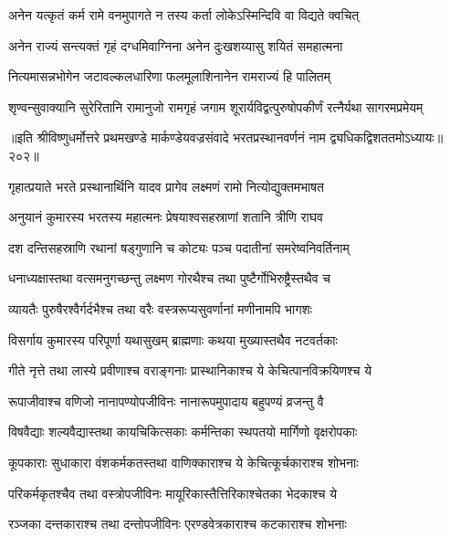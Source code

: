 \twolineshloka
{अनेन यत्कृतं कर्म रामे वनमुपागते}
{न तस्य कर्ता लोकेऽस्मिन्दिवि वा विद्यते क्वचित्}%

\twolineshloka
{अनेन राज्यं सन्त्यक्तं गृहं दग्धमिवाग्निना}
{अनेन दुःखशय्यासु शयितं समहात्मना}%

\twolineshloka
{नित्यमासन्नभोगेन जटावल्कलधारिणा}
{फलमूलाशिनानेन रामराज्यं हि पालितम्}%

\twolineshloka
{शृण्वन्सुवाक्यानि सुरेरितानि रामानुजो रामगृहं जगाम}
{शूरार्यविद्वत्पुरुषोपकीर्णं रत्नैर्यथा सागरमप्रमेयम्}%

॥इति श्रीविष्णुधर्मोत्तरे प्रथमखण्डे मार्कण्डेयवज्रसंवादे भरतप्रस्थानवर्णनं नाम द्व्यधिकद्विशततमोऽध्यायः॥२०२॥



\twolineshloka
{गृहात्प्रयाते भरते प्रस्थानार्थिनि यादव}
{प्रागेव लक्ष्मणं रामो नित्योद्युक्तमभाषत}%

\twolineshloka
{अनुयानं कुमारस्य भरतस्य महात्मनः}
{प्रेषयाश्वसहस्राणां शतानि त्रीणि राघव}%

\twolineshloka
{दश दन्तिसहस्राणि रथानां षड्गुणानि च}
{कोट्यः पञ्च पदातीनां समरेष्वनिवर्तिनाम्}%

\twolineshloka
{धनाध्यक्षास्तथा वत्समनुगच्छन्तु लक्ष्मण}
{गोरथैश्च तथा पुष्टैर्गोभिरुष्ट्रैस्तथैव च}%

\twolineshloka
{व्यायतैः पुरुषैरश्वैर्गर्दभैश्च तथा वरैः}
{वस्त्ररूप्यसुवर्णानां मणीनामपि भागशः}%

\twolineshloka
{विसर्गाय कुमारस्य परिपूर्णा यथासुखम्}
{ब्राह्मणाः कथया मुख्यास्तथैव नटवर्तकाः}%

\twolineshloka
{गीते नृत्ते तथा लास्ये प्रवीणाश्च वराङ्गनाः}
{प्रास्थानिकाश्च ये केचित्पानविक्रयिणश्च ये}%

\twolineshloka
{रूपाजीवाश्च वणिजो नानापण्योपजीविनः}
{नानारूपमुपादाय बहुपण्यं व्रजन्तु वै}%

\twolineshloka
{विषवैद्याः शल्यवैद्यास्तथा कायचिकित्सकाः}
{कर्मन्तिका स्थपतयो मार्गिणो वृक्षरोपकाः}%

\twolineshloka
{कूपकाराः सुधाकारा वंशकर्मकतस्तथा}
{वाणिक्काराश्च ये केचित्कूर्चकाराश्च शोभनाः} %

\twolineshloka
{परिकर्मकृतश्चैव तथा वस्त्रोपजीविनः}
{मायूरिकास्तैत्तिरिकाश्चेतका भेदकाश्च ये}%

\twolineshloka
{रञ्जका दन्तकाराश्च तथा दन्तोपजीविनः}
{एरण्डवेत्रकाराश्च कटकाराश्च शोभनाः}%

